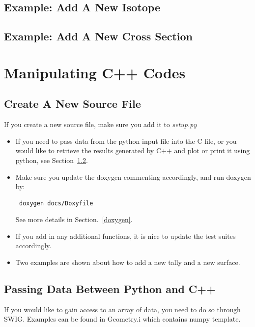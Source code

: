 \documentclass[titlepage]{article}
\begin{document}
\clearpage
\subsection{Example: Add A New Isotope}

\clearpage
\subsection{Example: Add A New Cross Section}






\clearpage
\section{Manipulating C++ Codes}\label{C++}
\subsection{Create A New Source File}
If you create a new source file, make sure you add it to \textit{setup.py}

\begin{itemize}
\item If you need to pass data from the python input file into the C file, or you would like to retrieve the results generated by C++ and plot or print it using python, see Section~\ref{data}. 
\item Make sure you update the doxygen commenting accordingly, and run doxygen by:
\begin{verbatim}
 doxygen docs/Doxyfile
\end{verbatim}
See more details in Section.~\ref{doxygen}. 

\item If you add in any additional functions, it is nice to update the test suites accordingly. 

\item Two examples are shown about how to add a new tally and a new surface. 
\end{itemize}

\subsection{Passing Data Between Python and C++} \label{data}
If you would like to gain access to an array of data, you need to do so through SWIG. Examples can be found in Geometry.i which contains numpy template. 
\end{document}
